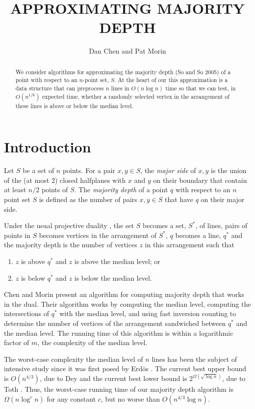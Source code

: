 \documentclass{patmorin}
\title{\MakeUppercase{Approximating Majority Depth}}
\author{Dan Chen and Pat Morin}
\begin{document}
\maketitle

\begin{abstract}
We consider algorithms for approximating the majority depth (So and So
2005) of a point with respect to an $n$-point set, $S$.  At the heart of
our this approximation is a data structure that can preprocess $n$ lines
in $O(n\log n)$ time so that we can test, in $O(n^{1/6})$ expected time,
whether a randomly selected vertex in the arrangement of these lines is
above or below the median level.
\end{abstract}

\section{Introduction}

Let $S$ be a set of $n$ points.  For a pair $x,y\in S$, the \emph{major
side} of $x,y$ is the union of the (at most 2) closed halfplanes with $x$
and $y$ on their boundary that contain at least $n/2$ points of $S$.
The \emph{majority depth} of a point $q$ with respect to an $n$ point
set $S$ is defined as the number of pairs $x,y\in S$ that have $q$
on their major side.

Under the usual projective duality \cite{eXX}, the set $S$ becomes a
set, $S^*$, of lines, pairs of points in $S$ becomes vertices in the
arrangement of $S^*$, $q$ becomes a line, $q^*$ and the majority depth is the number of vertices $z$ in this arrangement such that
\begin{enumerate}
\item $z$ is above $q^*$ and $z$ is above the median level; or
\item $z$ is below $q^*$ and $z$ is below the median level.
\end{enumerate}

Chen and Morin \cite{X} present an algorithm for computing majority
depth that works in the dual.  Their algorithm works by computing the
median level, computing the intersections of $q^*$ with the median level,
and using fast inversion counting to determine the number of vertices
of the arrangement sandwiched between $q^*$ and the median level. The
running time of this algorithm is within a logarithmic factor of $m$,
the complexity of the median level.

The worst-case complexity the median level of $n$ lines has been the
subject of intensive study since it was first posed by Erd\"os \cite{s}.
The current best upper bound is $O(n^{4/3})$, due to Dey \cite{S} and
the current best lower bound is $2^{\Omega(\sqrt{\log n})}$, due to
Toth \cite{S}.  Thus, the worst-case running time of our majority depth
algorithm is $\Omega(n\log^c n)$ for any constant $c$, but no worse than
$O(n^{4/3}\log n)$.
\end{document}
